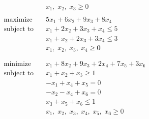 \documentclass[usenames,dvipsnames,8pt]{beamer}%
\begin{document}
\begin{frame}
\begin{columns}
\begin{column}{0.5\textwidth}
\begin{align*}
                                &x_1,\;x_2,\;x_3\geqslant 0\\
                                & \\
        \text{maximize}\quad    &5 x_1 + 6 x_2 + 9 x_3 + 8 x_4\\
        \text{subject to}\quad  &x_1 + 2 x_2 + 3 x_3 + x_4 \leqslant 5\\
                                &x_1 + x_2 + 2 x_3 + 3 x_4 \leqslant 3\\
                                &x_1,\;x_2,\;x_3,\;x_4\geqslant 0 \\
                                & \\
                                & \\
        \text{minimize}\quad    &x_1 + 8 x_2 + 9 x_3 + 2 x_4 + 7 x_5 + 3 x_6\\
        \text{subject to}\quad  &x_1 + x_2 + x_3\geqslant 1\\
                                &-x_1 + x_4 + x_5 = 0\\
                                &-x_2 - x_4 + x_6 = 0\\
                                &x_3 + x_5 + x_6\leqslant 1\\
                                &x_1,\;x_2,\;x_3,\;x_4,\;x_5,\;x_6\geqslant 0
      \end{align*}
    \end{column}
  \end{columns}
\end{frame}
\end{document}
